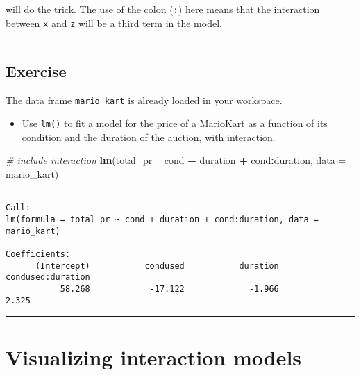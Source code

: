 \documentclass[
]{book}
\newenvironment{Shaded}{\begin{snugshade}}{\end{snugshade}}
\newcommand{\CommentTok}[1]{\textcolor[rgb]{0.56,0.35,0.01}{\textit{#1}}}
\newcommand{\DataTypeTok}[1]{\textcolor[rgb]{0.13,0.29,0.53}{#1}}
\newcommand{\KeywordTok}[1]{\textcolor[rgb]{0.13,0.29,0.53}{\textbf{#1}}}
\newcommand{\NormalTok}[1]{#1}
\newcommand{\OperatorTok}[1]{\textcolor[rgb]{0.81,0.36,0.00}{\textbf{#1}}}
\newcommand{\StringTok}[1]{\textcolor[rgb]{0.31,0.60,0.02}{#1}}
\providecommand{\tightlist}{%
  \setlength{\itemsep}{0pt}\setlength{\parskip}{0pt}}
\begin{document}
will do the trick. The use of the colon (\texttt{:}) here means that the interaction between \texttt{x} and \texttt{z} will be a third term in the model.

\begin{center}\rule{0.5\linewidth}{0.5pt}\end{center}

\hypertarget{exercise-6}{%
\subsection*{Exercise}\label{exercise-6}}

The data frame \texttt{mario\_kart} is already loaded in your workspace.

\begin{itemize}
\tightlist
\item
  Use \texttt{lm()} to fit a model for the price of a MarioKart as a function of its condition and the duration of the auction, with interaction.
\end{itemize}

\begin{Shaded}
\begin{Highlighting}[]
\CommentTok{# include interaction}
\KeywordTok{lm}\NormalTok{(total_pr }\OperatorTok{~}\StringTok{ }\NormalTok{cond }\OperatorTok{+}\StringTok{ }\NormalTok{duration }\OperatorTok{+}\StringTok{ }\NormalTok{cond}\OperatorTok{:}\NormalTok{duration, }\DataTypeTok{data =}\NormalTok{ mario_kart)}
\end{Highlighting}
\end{Shaded}

\begin{verbatim}

Call:
lm(formula = total_pr ~ cond + duration + cond:duration, data = mario_kart)

Coefficients:
      (Intercept)           condused           duration  condused:duration  
           58.268            -17.122             -1.966              2.325  
\end{verbatim}

\begin{center}\rule{0.5\linewidth}{0.5pt}\end{center}

\hypertarget{visualizing-interaction-models}{%
\section{Visualizing interaction models}\label{visualizing-interaction-models}}
\end{document}
